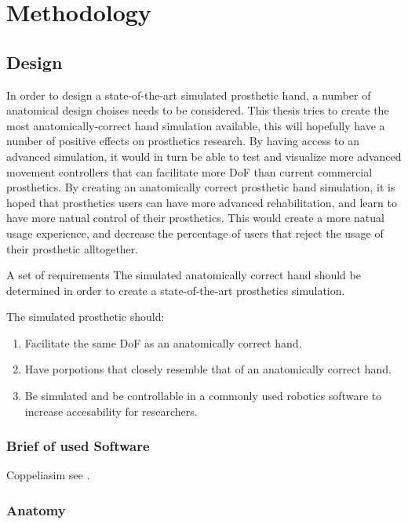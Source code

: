 \documentclass[../main.tex]{subfiles}
\begin{document}
\section{Methodology}

\subsection{Design}

In order to design a state-of-the-art simulated prosthetic hand, a number of anatomical design choises needs to be considered.
This thesis tries to create the most anatomically-correct hand simulation available, this will hopefully have a number of positive effects on prosthetics research.
By having access to an advanced simulation, it would in turn be able to test and visualize more advanced movement controllers that can facilitate more DoF than current commercial prosthetics. 
By creating an anatomically correct prosthetic hand simulation, it is hoped that prosthetics users can have more advanced rehabilitation, and learn to have more natual control of their prosthetics. This would create a more natual usage experience, and decrease the percentage of users that reject the usage of their prosthetic alltogether.

A set of requirements The simulated anatomically correct hand should be determined in order to create a state-of-the-art prosthetics simulation.

The simulated prosthetic should:

\begin{enumerate}
\item Facilitate the same DoF as an anatomically correct hand.
\item Have porpotions that closely resemble that of an anatomically correct hand.
\item Be simulated and be controllable in a commonly used robotics software to increase accesability for researchers.
\end{enumerate}


\subsubsection{Brief of used Software}
\label{sec:software}

Coppeliasim see \cite{coppeliasim}.

\subsubsection{Anatomy}
\label{sec:anatomy}
\end{document}
